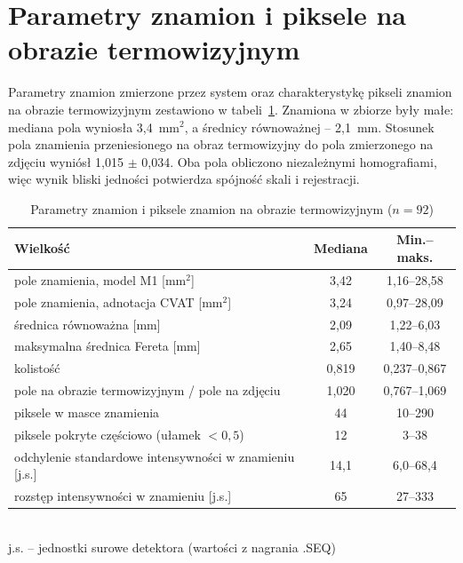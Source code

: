 \section{Parametry znamion i piksele na obrazie termowizyjnym}
\label{sec:wyniki-piksele}

Parametry znamion zmierzone przez system oraz charakterystykę pikseli znamion na obrazie termowizyjnym zestawiono w tabeli~\ref{tab:znamiona}. Znamiona w zbiorze były małe: mediana pola wyniosła 3,4~mm$^2$, a średnicy równoważnej -- 2,1~mm. Stosunek pola znamienia przeniesionego na obraz termowizyjny do pola zmierzonego na zdjęciu wyniósł 1,015 $\pm$ 0,034. Oba pola obliczono niezależnymi homografiami, więc wynik bliski jedności potwierdza spójność skali i rejestracji.

\begin{table}[htbp]
  \centering
  \caption{Parametry znamion i piksele znamion na obrazie termowizyjnym ($n = 92$)}
  \label{tab:znamiona}
  \small
  \begin{tabular}{lcc}
    \toprule
    Wielkość & Mediana & Min.--maks. \\
    \midrule
    pole znamienia, model M1 [mm$^2$] & 3,42 & 1,16--28,58 \\
    pole znamienia, adnotacja CVAT [mm$^2$] & 3,24 & 0,97--28,09 \\
    średnica równoważna [mm] & 2,09 & 1,22--6,03 \\
    maksymalna średnica Fereta [mm] & 2,65 & 1,40--8,48 \\
    kolistość & 0,819 & 0,237--0,867 \\
    pole na obrazie termowizyjnym / pole na zdjęciu & 1,020 & 0,767--1,069 \\
    piksele w masce znamienia & 44 & 10--290 \\
    piksele pokryte częściowo (ułamek $< 0{,}5$) & 12 & 3--38 \\
    odchylenie standardowe intensywności w znamieniu [j.s.] & 14,1 & 6,0--68,4 \\
    rozstęp intensywności w znamieniu [j.s.] & 65 & 27--333 \\
    \bottomrule
  \end{tabular}
  \\[2pt]{\footnotesize j.s. -- jednostki surowe detektora (wartości z nagrania .SEQ)}
\end{table}


